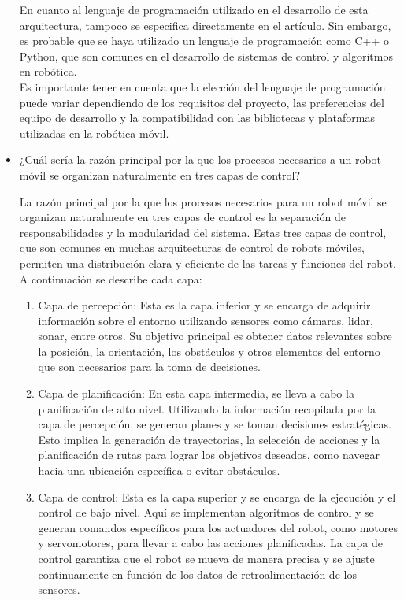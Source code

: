 \documentclass{article}
\begin{document}
\begin{itemize}
  En cuanto al lenguaje de programación utilizado en el desarrollo de esta arquitectura, tampoco se especifica directamente en el artículo. Sin embargo, es probable que se haya utilizado un lenguaje de programación como C++ o Python, que son comunes en el desarrollo de sistemas de control y algoritmos en robótica.\\

  Es importante tener en cuenta que la elección del lenguaje de programación puede variar dependiendo de los requisitos del proyecto, las preferencias del equipo de desarrollo y la compatibilidad con las bibliotecas y plataformas utilizadas en la robótica móvil.
  
\item{¿Cuál sería la razón principal por la que los procesos necesarios a un robot móvil se organizan naturalmente en tres capas de control?}

  La razón principal por la que los procesos necesarios para un robot móvil se organizan naturalmente en tres capas de control es la separación de responsabilidades y la modularidad del sistema. Estas tres capas de control, que son comunes en muchas arquitecturas de control de robots móviles, permiten una distribución clara y eficiente de las tareas y funciones del robot. A continuación se describe cada capa:

  \begin{enumerate}
  \item Capa de percepción: Esta es la capa inferior y se encarga de adquirir información sobre el entorno utilizando sensores como cámaras, lidar, sonar, entre otros. Su objetivo principal es obtener datos relevantes sobre la posición, la orientación, los obstáculos y otros elementos del entorno que son necesarios para la toma de decisiones.
  \item Capa de planificación: En esta capa intermedia, se lleva a cabo la planificación de alto nivel. Utilizando la información recopilada por la capa de percepción, se generan planes y se toman decisiones estratégicas. Esto implica la generación de trayectorias, la selección de acciones y la planificación de rutas para lograr los objetivos deseados, como navegar hacia una ubicación específica o evitar obstáculos.
  \item Capa de control: Esta es la capa superior y se encarga de la ejecución y el control de bajo nivel. Aquí se implementan algoritmos de control y se generan comandos específicos para los actuadores del robot, como motores y servomotores, para llevar a cabo las acciones planificadas. La capa de control garantiza que el robot se mueva de manera precisa y se ajuste continuamente en función de los datos de retroalimentación de los sensores.
  \end{enumerate}


\end{itemize}
\end{document}
